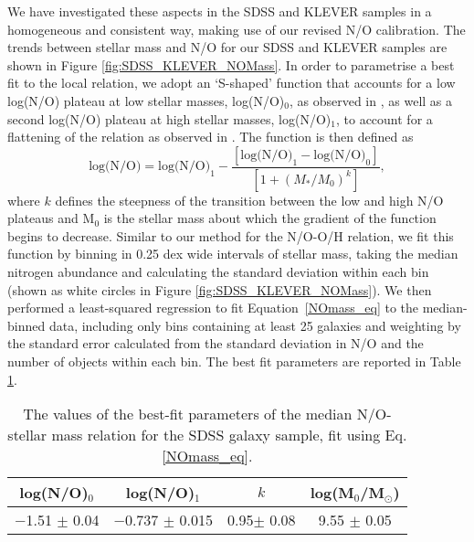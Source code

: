 \documentclass[usenatbib]{mnras} %
\begin{document}
We have investigated these aspects in the SDSS and KLEVER samples in a homogeneous and consistent way, making use of our revised N/O calibration.
The trends between stellar mass and N/O for our SDSS and KLEVER samples are shown in Figure \ref{fig:SDSS_KLEVER_NOMass}. In order to parametrise a best fit to the local relation, we adopt an `S-shaped' function that accounts for a low log(N/O) plateau at low stellar masses, log(N/O)$_0$, as observed in \cite{AndrewsMartini_2013}, as well as a second log(N/O) plateau at high stellar masses, log(N/O)$_1$, to account for a flattening of the relation as observed in \cite{PMC_2009}. The function is then defined as
\begin{equation}\label{NOmass_eq}
\text{log(N/O)} = \text{log(N/O)}_1 - \frac{\left[\text{log(N/O)}_1 - \text{log(N/O)}_0\right]}{\left[ 1 + \left( M_* / M_0\right) ^k \right]},
\end{equation}
where $k$ defines the steepness of the transition between the low and high N/O plateaus and M$_0$ is the stellar mass about which the gradient of the function begins to decrease. Similar to our method for the N/O-O/H relation, we fit this function by binning in 0.25 dex wide intervals of stellar mass, taking the median nitrogen abundance and calculating the standard deviation within each bin (shown as white circles in Figure \ref{fig:SDSS_KLEVER_NOMass}). We then performed a least-squared regression to fit Equation~\ref{NOmass_eq} to the median-binned data, including only bins containing at least 25 galaxies and weighting by the standard error calculated from the standard deviation in N/O and the number of objects within each bin. The best fit parameters are reported in Table \ref{tab:NOMass_params}. 
\begin{table}
 \centering
 \caption{The values of the best-fit parameters of the median N/O-stellar mass relation for the SDSS galaxy sample, fit using Eq. \ref{NOmass_eq}.}
 \label{tab:NOMass_params}
 \begin{tabular}{cccc}
  \hline
  \hline
  log(N/O)$_0$ & log(N/O)$_1$ & $k$ & log(M$_0$/M$_\odot$)\\
  \hline
  $-$1.51 $\pm$ 0.04 & $-$0.737 $\pm$ 0.015 & 0.95$\pm$ 0.08 & 9.55 $\pm$ 0.05\\[2pt]
  \hline
  \hline
 \end{tabular}
\end{table}
\end{document}
